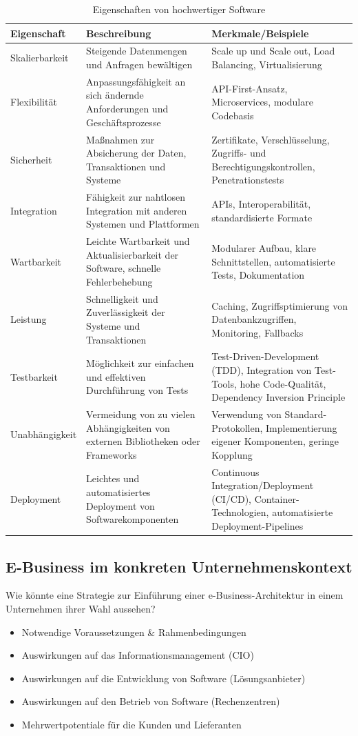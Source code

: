 \documentclass[notitlepage, hidelinks]{article}
\begin{document}
\begin{table}[ht]
\centering
\caption{Eigenschaften von hochwertiger Software}
\label{table:software-qualities}
\begin{tabular}{|l|p{6cm}|p{6cm}|}
\hline
\textbf{Eigenschaft} & \textbf{Beschreibung} & \textbf{Merkmale/Beispiele} \\
\hline
Skalierbarkeit & Steigende Datenmengen und Anfragen bewältigen & Scale up und Scale out, Load Balancing, Virtualisierung \\ \hline
Flexibilität & Anpassungsfähigkeit an sich ändernde Anforderungen und Geschäftsprozesse & API-First-Ansatz, Microservices, modulare Codebasis \\ \hline
Sicherheit & Maßnahmen zur Absicherung der Daten, Transaktionen und Systeme & Zertifikate, Verschlüsselung, Zugriffs- und Berechtigungskontrollen, Penetrationstests \\ \hline
Integration & Fähigkeit zur nahtlosen Integration mit anderen Systemen und Plattformen & APIs, Interoperabilität, standardisierte Formate \\ \hline
Wartbarkeit & Leichte Wartbarkeit und Aktualisierbarkeit der Software, schnelle Fehlerbehebung & Modularer Aufbau, klare Schnittstellen, automatisierte Tests, Dokumentation \\ \hline
Leistung & Schnelligkeit und Zuverlässigkeit der Systeme und Transaktionen & Caching, Zugriffsptimierung von Datenbankzugriffen, Monitoring, Fallbacks \\ \hline
Testbarkeit & Möglichkeit zur einfachen und effektiven Durchführung von Tests & Test-Driven-Development (TDD), Integration von Test-Tools, hohe Code-Qualität, Dependency Inversion Principle \\ \hline
Unabhängigkeit & Vermeidung von zu vielen Abhängigkeiten von externen Bibliotheken oder Frameworks & Verwendung von Standard-Protokollen, Implementierung eigener Komponenten, geringe Kopplung \\ \hline
Deployment & Leichtes und automatisiertes Deployment von Softwarekomponenten & Continuous Integration/Deployment (CI/CD), Container-Technologien, automatisierte Deployment-Pipelines \\ \hline
\end{tabular}
\end{table}

\subsection{E-Business im konkreten Unternehmenskontext}
Wie könnte eine Strategie zur Einführung einer e-Business-Architektur in einem Unternehmen ihrer Wahl aussehen?
\begin{itemize}
\item Notwendige Voraussetzungen \& Rahmenbedingungen
\item Auswirkungen auf das Informationsmanagement (CIO)
\item Auswirkungen auf die Entwicklung von Software (Lösungsanbieter)
\item Auswirkungen auf den Betrieb von Software (Rechenzentren)
\item Mehrwertpotentiale für die Kunden und Lieferanten
\end{itemize}
\end{document}
